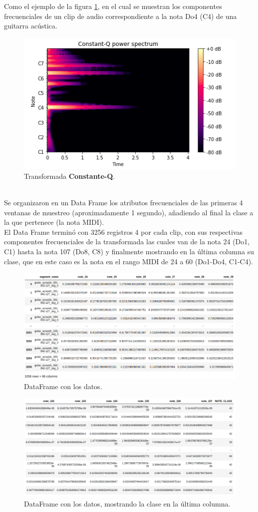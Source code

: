 \documentclass[12pt]{article}
\begin{document}
	Como el ejemplo de la figura \ref{fig1}, en el cual se muestran los componentes frecuenciales de un clip de audio correspondiente a la nota Do4 (C4) de una guitarra acústica.\\
	\begin{figure}[h!]
		\centering
		\includegraphics[width=.8\linewidth]{qtransform}
		\caption{Transformada \textbf{Constante-Q}.}
		\label{fig1}
	\end{figure}
\\
	Se organizaron en un Data Frame los atributos frecuenciales de las primeras 4 ventanas de muestreo (aproximadamente 1 segundo), añadiendo al final la clase a la que pertenece (la nota MIDI).\\
	El Data Frame terminó con 3256 registros 4 por cada clip, con sus respectivas componentes frecuenciales de la transformada las cuales van de la nota 24 (Do1, C1) hasta la nota 107 (Do8, C8) y finalmente mostrando en la última columna su clase, que en este caso es la nota en el rango MIDI de 24 a 60 (Do1-Do4, C1-C4).
	
	\begin{figure}[h!]\label{fig2}
	\centering
	\includegraphics[width=.82\linewidth]{qtransfomtable_01}
	\caption{DataFrame con los datos.}
\end{figure}
	\begin{figure}[h!]\label{fig3}
	\centering
	\includegraphics[width=.82\linewidth]{qtransformtable_02}
	\caption{DataFrame con los datos, mostrando la clase en la última columna.}
\end{figure}
\clearpage
	
\end{document}
